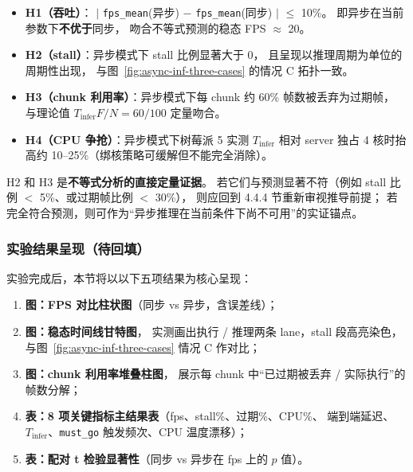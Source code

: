 \begin{itemize}[leftmargin=2em]
  \item \textbf{H1（吞吐）}：
        $|$ \texttt{fps\_mean}(异步) $-$ \texttt{fps\_mean}(同步) $|$ $\leq$ 10\%。
        即异步在当前参数下\textbf{不优于}同步，
        吻合不等式预测的稳态 FPS $\approx$ 20。
  \item \textbf{H2（stall）}：异步模式下 stall 比例显著大于 0，
        且呈现以推理周期为单位的周期性出现，
        与图~\ref{fig:async-inf-three-cases} 的情况 C 拓扑一致。
  \item \textbf{H3（chunk 利用率）}：异步模式下每 chunk 约 60\% 帧数被丢弃为过期帧，
        与理论值 $T_{\text{infer}} F / N = 60/100$ 定量吻合。
  \item \textbf{H4（CPU 争抢）}：异步模式下树莓派 5 实测 $T_{\text{infer}}$
        相对 server 独占 4 核时抬高约 10--25\%（绑核策略可缓解但不能完全消除）。
\end{itemize}

H2 和 H3 是\textbf{不等式分析的直接定量证据}。
若它们与预测显著不符（例如 stall 比例 $<$ 5\%、或过期帧比例 $<$ 30\%），
则应回到 4.4.4 节重新审视推导前提；
若完全符合预测，则可作为``异步推理在当前条件下尚不可用''的实证锚点。

\subsubsection{实验结果呈现（待回填）}\label{sec:async-exp-results}

实验完成后，本节将以以下五项结果为核心呈现：
\begin{enumerate}[leftmargin=2em]
  \item \textbf{图：FPS 对比柱状图}（同步 vs 异步，含误差线）；
  \item \textbf{图：稳态时间线甘特图}，
        实测画出执行 / 推理两条 lane，stall 段高亮染色，
        与图~\ref{fig:async-inf-three-cases} 情况 C 作对比；
  \item \textbf{图：chunk 利用率堆叠柱图}，
        展示每 chunk 中``已过期被丢弃 / 实际执行''的帧数分解；
  \item \textbf{表：8 项关键指标主结果表}（fps、stall\%、过期\%、CPU\%、
        端到端延迟、$T_{\text{infer}}$、\texttt{must\_go} 触发频次、CPU 温度漂移）；
  \item \textbf{表：配对 t 检验显著性}（同步 vs 异步在 fps 上的 $p$ 值）。
\end{enumerate}


